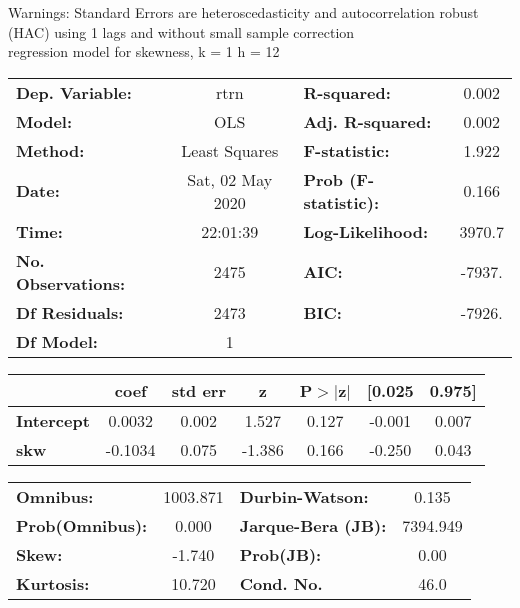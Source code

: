 Warnings: \newline
 [1] Standard Errors are heteroscedasticity and autocorrelation robust (HAC) using 1 lags and without small sample correction\\ 

regression model for skewness, k = 1 h = 12\begin{center}
\begin{tabular}{lclc}
\toprule
\textbf{Dep. Variable:}    &       rtrn       & \textbf{  R-squared:         } &     0.002   \\
\textbf{Model:}            &       OLS        & \textbf{  Adj. R-squared:    } &     0.002   \\
\textbf{Method:}           &  Least Squares   & \textbf{  F-statistic:       } &     1.922   \\
\textbf{Date:}             & Sat, 02 May 2020 & \textbf{  Prob (F-statistic):} &    0.166    \\
\textbf{Time:}             &     22:01:39     & \textbf{  Log-Likelihood:    } &    3970.7   \\
\textbf{No. Observations:} &        2475      & \textbf{  AIC:               } &    -7937.   \\
\textbf{Df Residuals:}     &        2473      & \textbf{  BIC:               } &    -7926.   \\
\textbf{Df Model:}         &           1      & \textbf{                     } &             \\
\bottomrule
\end{tabular}
\begin{tabular}{lcccccc}
                   & \textbf{coef} & \textbf{std err} & \textbf{z} & \textbf{P$> |$z$|$} & \textbf{[0.025} & \textbf{0.975]}  \\
\midrule
\textbf{Intercept} &       0.0032  &        0.002     &     1.527  &         0.127        &       -0.001    &        0.007     \\
\textbf{skw}       &      -0.1034  &        0.075     &    -1.386  &         0.166        &       -0.250    &        0.043     \\
\bottomrule
\end{tabular}
\begin{tabular}{lclc}
\textbf{Omnibus:}       & 1003.871 & \textbf{  Durbin-Watson:     } &    0.135  \\
\textbf{Prob(Omnibus):} &   0.000  & \textbf{  Jarque-Bera (JB):  } & 7394.949  \\
\textbf{Skew:}          &  -1.740  & \textbf{  Prob(JB):          } &     0.00  \\
\textbf{Kurtosis:}      &  10.720  & \textbf{  Cond. No.          } &     46.0  \\
\bottomrule
\end{tabular}
\end{center}

